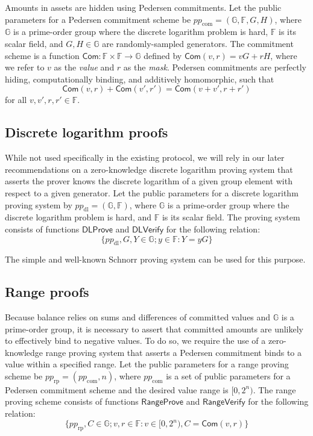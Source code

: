 \documentclass{article}
\newcommand{\G}{\mathbb{G}}
\newcommand{\F}{\mathbb{F}}
\newcommand{\func}[1]{\mathsf{#1}}
\newcommand{\com}{\func{Com}}
\begin{document}
Amounts in assets are hidden using Pedersen commitments.
Let the public parameters for a Pedersen commitment scheme be $pp_{\text{com}} = (\G,\F,G,H)$, where $\G$ is a prime-order group where the discrete logarithm problem is hard, $\F$ is its scalar field, and $G,H \in \G$ are randomly-sampled generators.
The commitment scheme is a function $\com: \F \times \F \to \G$ defined by $\com(v,r) = vG + rH$, where we refer to $v$ as the \textit{value} and $r$ as the \textit{mask}.
Pedersen commitments are perfectly hiding, computationally binding, and additively homomorphic, such that
$$\com(v,r) + \com(v',r') = \com(v + v',r + r')$$
for all $v,v',r,r' \in \F$.

\subsection{Discrete logarithm proofs}

While not used specifically in the existing protocol, we will rely in our later recommendations on a zero-knowledge discrete logarithm proving system that asserts the prover knows the discrete logarithm of a given group element with respect to a given generator.
Let the public parameters for a discrete logarithm proving system by $pp_{\text{dl}} = (\G,\F)$, where $\G$ is a prime-order group where the discrete logarithm problem is hard, and $\F$ is its scalar field.
The proving system consists of functions $\func{DLProve}$ and $\func{DLVerify}$ for the following relation:
$$\{pp_{\text{dl}}, G, Y \in \G ; y \in \F : Y = yG\}$$

The simple and well-known Schnorr proving system can be used for this purpose.

\subsection{Range proofs}

Because balance relies on sums and differences of committed values and $\G$ is a prime-order group, it is necessary to assert that committed amounts are unlikely to effectively bind to negative values.
To do so, we require the use of a zero-knowledge range proving system that asserts a Pedersen commitment binds to a value within a specified range.
Let the public parameters for a range proving scheme be $pp_{\text{rp}} = (pp_{\text{com}},n)$, where $pp_{\text{com}}$ is a set of public parameters for a Pedersen commitment scheme and the desired value range is $[0,2^n)$.
The range proving scheme consists of functions $\func{RangeProve}$ and $\func{RangeVerify}$ for the following relation:
$$\{pp_{\text{rp}}, C \in \G ; v, r \in \F : v \in [0,2^n), C = \com(v,r)\}$$
\end{document}

